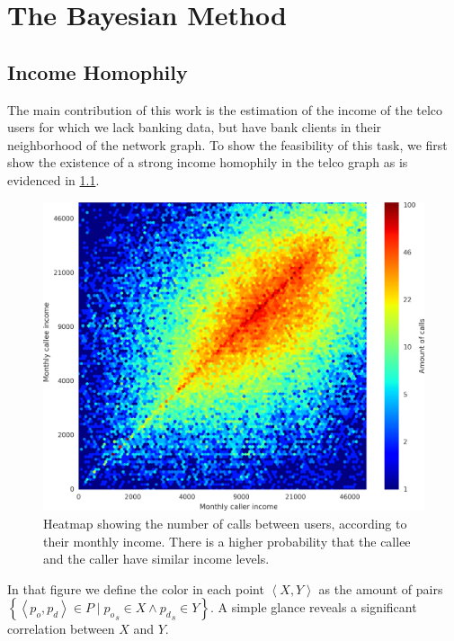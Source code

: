 \chapter{The Bayesian Method}
\label{sec:inference_methodology}

\section{Income Homophily}
\label{subsec:income_homophily}

The main contribution of this work is the estimation of the income of the telco users for which we lack banking data, but have bank clients in their neighborhood of the network graph. To show the feasibility of this task, we first show the existence of a strong income homophily in the telco graph as is evidenced in \cref{fig:homophily_heatmap}.

\begin{figure}
\centering
\includegraphics[width=\textwidth]{figures/Homophily_income_origin_target_1/Homophily_income_origin_target_1.png}
\caption{Heatmap showing the number of calls between users, according to their monthly income. There is a higher probability that the callee and the caller have similar income levels.}
\label{fig:homophily_heatmap}
\end{figure}

In that figure we define the color in each point $\left< X, Y \right>$ as the amount of pairs $\left\{ \left< p_o, p_d \right> \in P \mid {p_o}_s \in X \land {p_d}_s \in Y \right\}$. A simple glance reveals a significant correlation between $X$ and $Y$.

